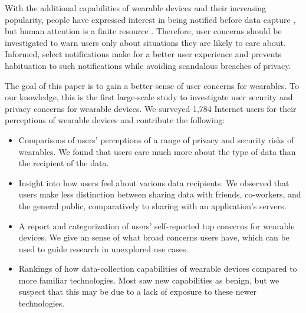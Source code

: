 With the additional capabilities of wearable devices and their increasing popularity, people have expressed interest in being notified before data capture \cite{denning2014situ}, but human attention is a finite resource \cite{bohme2011security}. Therefore, user concerns should be investigated to warn users only about situations they are likely to care about. Informed, select notifications make for a better user experience and prevents habituation to such notifications while avoiding scandalous breaches of privacy.

The goal of this paper is to gain a better sense of user concerns for wearables. To our knowledge, this is the first large-scale study to investigate user security and privacy concerns for wearable devices. We surveyed 1,784 Internet users for their perceptions of wearable devices and contribute the following: \\[-0.8cm]

\begin{itemize} \itemsep1pt \parskip0pt 
\item Comparisons of users' perceptions of a range of privacy and security risks of wearables. We found that users care much more about the type of data than the recipient of the data.
\item Insight into how users feel about various data recipients. We observed that users make less distinction between sharing data with friends, co-workers, and the general public, comparatively to sharing with an application's servers.
\item A report and categorization of users' self-reported top concerns for wearable devices. We give an sense of what broad concerns users have, which can be used to guide research in unexplored use cases. 
\item Rankings of how data-collection capabilities of wearable devices compared to more familiar technologies.  Most saw new capabilities as benign, but we suspect that this may be due to a lack of exposure to these newer technologies.
\end{itemize}

